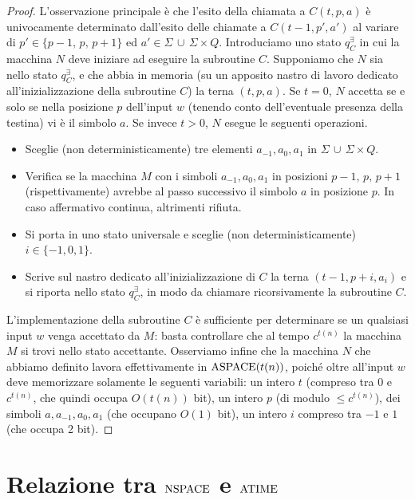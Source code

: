 \begin{proof}
  L'osservazione principale è che l'esito della chiamata a $C(t,p,a)$ è univocamente determinato dall'esito delle chiamate a $C(t-1,p',a')$ al variare di $p'\in\{p-1,\,p,\,p+1\}$ ed $a'\in \Sigma \,\cup\, \Sigma\times Q$.
  Introduciamo uno stato $q_C^\exists$ in cui la macchina $N$ deve iniziare ad eseguire la subroutine $C$.
  Supponiamo che $N$ sia nello stato $q_C^\exists$, e che abbia in memoria (su un apposito nastro di lavoro dedicato all'inizializzazione della subroutine $C$) la terna $(t, p, a)$.
  Se $t=0$, $N$ accetta se e solo se nella posizione $p$ dell'input $w$ (tenendo conto dell'eventuale presenza della testina) vi è il simbolo $a$.
  Se invece $t>0$, $N$ esegue le seguenti operazioni.
  \begin{itemize}
    \item Sceglie (non deterministicamente) tre elementi $a_{-1},a_0,a_1$ in $\Sigma \,\cup\, \Sigma\times Q$.
    \item Verifica se la macchina $M$ con i simboli $a_{-1}, a_0, a_1$ in posizioni $p-1,\,p,\,p+1$ (rispettivamente) avrebbe al passo successivo il simbolo $a$ in posizione $p$.
    In caso affermativo continua, altrimenti rifiuta.
    \item Si porta in uno stato universale e sceglie (non deterministicamente) $i\in\{-1,0,1\}$.
    \item Scrive sul nastro dedicato all'inizializzazione di $C$ la terna $(t-1,p+i,a_i)$ e si riporta nello stato $q_C^\exists$, in modo da chiamare ricorsivamente la subroutine $C$.
  \end{itemize}
  
  L'implementazione della subroutine $C$ è sufficiente per determinare se un qualsiasi input $w$ venga accettato da $M$: basta controllare che al tempo $c^{t(n)}$ la macchina $M$ si trovi nello stato accettante.
  Osserviamo infine che la macchina $N$ che abbiamo definito lavora effettivamente in $\operatorname{ASPACE}(t(n))$, poiché oltre all'input $w$ deve memorizzare solamente le seguenti variabili: un intero $t$ (compreso tra $0$ e $c^{t(n)}$, che quindi occupa $O(t(n))$ bit), un intero $p$ (di modulo $\leq c^{t(n)}$), dei simboli $a,a_{-1},a_0,a_1$ (che occupano $O(1)$ bit), un intero $i$ compreso tra $-1$ e $1$ (che occupa 2 bit).
\end{proof}


\section{Relazione tra \texorpdfstring{$\operatorname{NSPACE}$}{NSPACE} e \texorpdfstring{$\operatorname{ATIME}$}{ATIME}}


